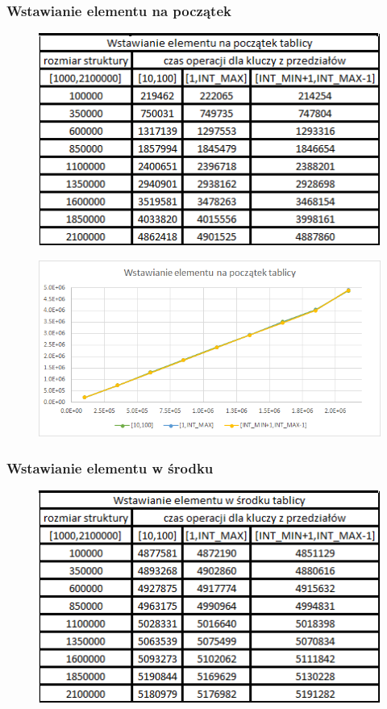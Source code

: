 \documentclass{article}
\begin{document}
\subsubsection*{Wstawianie elementu na początek}
\begin{figure}[h!]

\includegraphics{images/TAB_POCZATEK.png}

\end{figure}

\begin{figure}[h!]
\includegraphics[width=11.3cm]{images/poczatek_wykres.png}
\end{figure}

\newpage
\subsubsection*{Wstawianie elementu w środku}

\begin{figure}[h!]
    \centering
    \includegraphics{images/TAB_SRODEK.png}
\end{figure}
\end{document}
